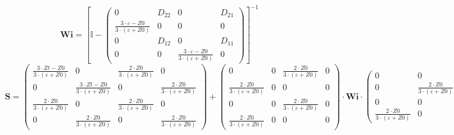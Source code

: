 \[ \mathbf{Wi} =  \left[ \mathbb{I}  - \left(\begin{array}{cccc} 0 & D_{22} & 0 & D_{21} \\ \frac{3\cdot \varepsilon-Z0}{3\cdot \left(\varepsilon+Z0\right)} & 0 & 0 & 0 \\ 0 & D_{12} & 0 & D_{11} \\ 0 & 0 & \frac{3\cdot \varepsilon-Z0}{3\cdot \left(\varepsilon+Z0\right)} & 0 \end{array}\right) \right]^{-1}  \]
\[ \mathbf{S} = \left(\begin{array}{cccc} \frac{3\cdot Zt-Z0}{3\cdot \left(\varepsilon+Z0\right)} & 0 & \frac{2\cdot Z0}{3\cdot \left(\varepsilon+Z0\right)} & 0 \\ 0 & \frac{3\cdot Zt-Z0}{3\cdot \left(\varepsilon+Z0\right)} & 0 & \frac{2\cdot Z0}{3\cdot \left(\varepsilon+Z0\right)} \\ \frac{2\cdot Z0}{3\cdot \left(\varepsilon+Z0\right)} & 0 & \frac{2\cdot Z0}{3\cdot \left(\varepsilon+Z0\right)} & 0 \\ 0 & \frac{2\cdot Z0}{3\cdot \left(\varepsilon+Z0\right)} & 0 & \frac{2\cdot Z0}{3\cdot \left(\varepsilon+Z0\right)} \end{array}\right) + \left(\begin{array}{cccc} 0 & 0 & \frac{2\cdot Z0}{3\cdot \left(\varepsilon+Z0\right)} & 0 \\ \frac{2\cdot Z0}{3\cdot \left(\varepsilon+Z0\right)} & 0 & 0 & 0 \\ 0 & 0 & \frac{2\cdot Z0}{3\cdot \left(\varepsilon+Z0\right)} & 0 \\ \frac{2\cdot Z0}{3\cdot \left(\varepsilon+Z0\right)} & 0 & 0 & 0 \end{array}\right) \cdot \mathbf{Wi} \cdot\left(\begin{array}{cccc} 0 & 0 & 0 & 0 \\ 0 & \frac{2\cdot Z0}{3\cdot \left(\varepsilon+Z0\right)} & 0 & \frac{2\cdot Z0}{3\cdot \left(\varepsilon+Z0\right)} \\ 0 & 0 & 0 & 0 \\ \frac{2\cdot Z0}{3\cdot \left(\varepsilon+Z0\right)} & 0 & \frac{2\cdot Z0}{3\cdot \left(\varepsilon+Z0\right)} & 0 \end{array}\right) \]
